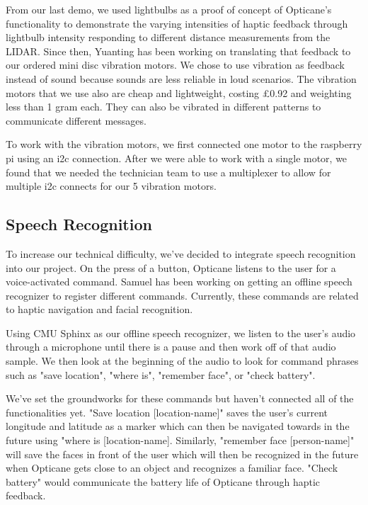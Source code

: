 \documentclass{article}
\begin{document}
From our last demo, we used lightbulbs as a proof of concept of Opticane's functionality to demonstrate the varying intensities of haptic feedback through lightbulb intensity responding to different distance measurements from the LIDAR. Since then, Yuanting has been working on translating that feedback to our ordered mini disc vibration motors. We chose to use vibration as feedback instead of sound because sounds are less reliable in loud scenarios. The vibration motors that we use also are cheap and lightweight, costing £0.92 and weighting less than 1 gram each. They can also be vibrated in different patterns to communicate different messages.

To work with the vibration motors, we first connected one motor to the raspberry pi using an i2c connection. After we were able to work with a single motor, we found that we needed the technician team to use a multiplexer to allow for multiple i2c connects for our 5 vibration motors.

\subsection{Speech Recognition}

To increase our technical difficulty, we've decided to integrate speech recognition into our project. On the press of a button, Opticane listens to the user for a voice-activated command. Samuel has been working on getting an offline speech recognizer to register different commands. Currently, these commands are related to haptic navigation and facial recognition.

Using CMU Sphinx as our offline speech recognizer, we listen to the user's audio through a microphone until there is a pause and then work off of that audio sample. We then look at the beginning of the audio to look for command phrases such as "save location", "where is", "remember face", or "check battery".

We've set the groundworks for these commands but haven't connected all of the functionalities yet. "Save location [location-name]" saves the user's current longitude and latitude as a marker which can then be navigated towards in the future using "where is [location-name]. Similarly, "remember face [person-name]" will save the faces in front of the user which will then be recognized in the future when Opticane gets close to an object and recognizes a familiar face. "Check battery" would communicate the battery life of Opticane through haptic feedback.
\end{document}
